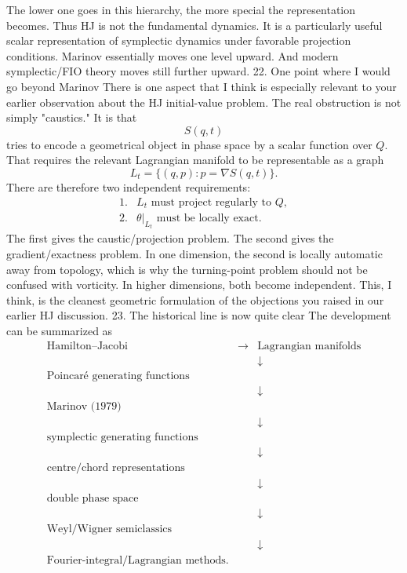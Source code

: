 The lower one goes in this hierarchy, the more special the representation becomes.
Thus HJ is not the fundamental dynamics. It is a particularly useful scalar representation of symplectic dynamics under favorable projection conditions.
Marinov essentially moves one level upward.
And modern symplectic/FIO theory moves still further upward.
22. One point where I would go beyond Marinov
There is one aspect that I think is especially relevant to your earlier observation about the HJ initial-value problem.
The real obstruction is not simply "caustics."
It is that
$$ S(q,t) $$
tries to encode a geometrical object in phase space by a scalar function over \(Q\).
That requires the relevant Lagrangian manifold to be representable as a graph
$$ L_t=\{(q,p):p=\nabla S(q,t)\}. $$
There are therefore two independent requirements:
$$ \boxed{ \begin{array}{ll} 1.& L_t\text{ must project regularly to }Q,\\ 2.& \theta|_{L_t}\text{ must be locally exact}. \end{array}} $$
The first gives the caustic/projection problem.
The second gives the gradient/exactness problem.
In one dimension, the second is locally automatic away from topology, which is why the turning-point problem should not be confused with vorticity.
In higher dimensions, both become independent.
This, I think, is the cleanest geometric formulation of the objections you raised in our earlier HJ discussion.
23. The historical line is now quite clear
The development can be summarized as
$$ \begin{array}{rcl} \text{Hamilton--Jacobi} &\rightarrow& \text{Lagrangian manifolds}\\ &&\downarrow\\ \text{Poincaré generating functions} &&\\ &&\downarrow\\ \text{Marinov (1979)}\\ &&\downarrow\\ \text{symplectic generating functions}\\ &&\downarrow\\ \text{centre/chord representations}\\ &&\downarrow\\ \text{double phase space}\\ &&\downarrow\\ \text{Weyl/Wigner semiclassics}\\ &&\downarrow\\ \text{Fourier-integral/Lagrangian methods}. \end{array} $$
